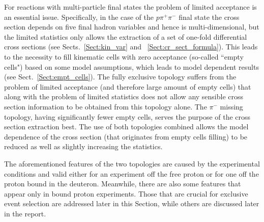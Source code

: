 For reactions with multi-particle final states the problem of limited acceptance is an essential issue. Specifically, in the case of the $p\pi^{+}\pi^{-}$ final state the cross section  depends on five final hadron variables and hence is multi-dimensional, but the limited statistics only allows the extraction of a set of one-fold differential cross sections (see Sects.~\ref{Sect:kin_var} and ~\ref{Sect:cr_sect_formula}). This leads to the necessity to fill kinematic cells with zero acceptance (so-called ``empty cells") based on some model assumptions, which leads to model dependent results (see Sect.~\ref{Sect:empt_cells}). The fully exclusive topology suffers from the problem of limited acceptance (and therefore large amount of empty cells) that along with the problem of limited statistics does not allow any sensible cross section information to be obtained from this topology alone. The $\pi^{-}$ missing topology, having significantly fewer empty cells, serves the purpose of the cross section extraction best. The use of both topologies combined allows the model dependence of the cross section (that originates from empty cells filling) to be reduced as well as slightly increasing the statistics.

The aforementioned features of the two topologies are caused by the experimental conditions and valid either for an experiment off the free proton or for one off the proton bound in the deuteron. Meanwhile, there are also some features that appear only in bound proton experiments. Those that are crucial for exclusive event selection are addressed later in this Section, while others are discussed later in the report.

